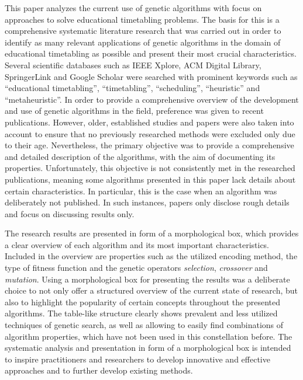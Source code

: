 \documentclass[sigconf]{acmart}
\begin{document}
This paper analyzes the current use of genetic algorithms with focus on
approaches to solve educational timetabling problems.
%
The basis for this is a comprehensive systematic literature research that
was carried out in order to identify as many relevant applications of genetic
algorithms in the domain of educational timetabling as possible and
present their most crucial characteristics.
%
Several scientific databases such as IEEE Xplore, ACM Digital Library,
SpringerLink and Google Scholar were searched with prominent keywords such as
\enquote{educational timetabling}, \enquote{timetabling}, \enquote{scheduling},
\enquote{heuristic} and \enquote{metaheuristic}.
%
In order to provide a comprehensive overview of the development and use of
genetic algorithms in the field, preference was given to recent publications.
However, older, established studies and papers were also taken into account
to ensure that no previously researched methods were excluded only due to their
age.
%
Nevertheless, the primary objective was to provide a comprehensive and detailed
description of the algorithms, with the aim of documenting its properties.
Unfortunately, this objective is not consistently met in the researched
publications, meaning some algorithms presented in this paper lack details
about certain characteristics.
In particular, this is the case when an algorithm was deliberately not
published. In such instances, papers only disclose rough details and focus on
discussing results only.

The research results are presented in form of a morphological box, which
provides a clear overview of each algorithm and its most important
characteristics.
Included in the overview are properties such as the utilized encoding method,
the type of fitness function and the genetic operators \textit{selection},
\textit{crossover} and \textit{mutation}.
%
Using a morphological box for presenting the results was a deliberate choice
to not only offer a structured overview of the current state of research,
but also to highlight the popularity of certain concepts throughout the
presented algorithms.
The table-like structure clearly shows prevalent and less utilized techniques
of genetic search, as well as allowing to easily find combinations of algorithm
properties, which have not been used in this constellation before.
%
The systematic analysis and presentation in form of a morphological box is
intended to inspire practitioners and researchers to develop innovative
and effective approaches and to further develop existing methods.
\end{document}
